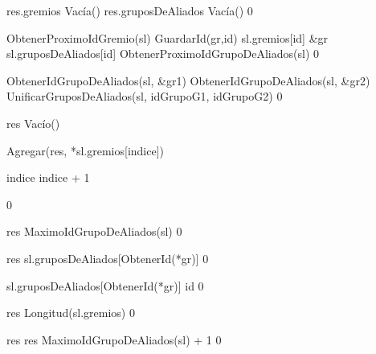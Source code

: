 {
	\state res.gremios \asig Vacía()					
	\state res.gruposDeAliados \asig Vacía()			
}
{0}

{
	\state {} \asig ObtenerProximoIdGremio(sl)			
	\state
	\state GuardarId(gr,id)												
	\state sl.gremios[id] \asig \&gr									
	\state sl.gruposDeAliados[id] \asig ObtenerProximoIdGrupoDeAliados(sl)			
}
{0}

{
	\state {} \asig ObtenerIdGrupoDeAliados(sl, \&gr1)			
	\state {} \asig ObtenerIdGrupoDeAliados(sl, \&gr2)			
	\state 
	\state UnificarGruposDeAliados(sl, idGrupoG1, idGrupoG2)							
}
{0}

{
	\state res \asig Vacío()								

	\state
	\state {} 						
					
		\state

		\state Agregar(res, *sl.gremios[indice])			

		\state
		\state indice \asig indice + 1						
	\endwhile
}
{0}

{
	\state res \asig MaximoIdGrupoDeAliados(sl)			
}
{0}

{
	\state res \asig sl.gruposDeAliados[ObtenerId(*gr)]			
}
{0}

{
	\state sl.gruposDeAliados[ObtenerId(*gr)] \asig id			
}
{0}

{
	\state res \asig Longitud(sl.gremios)			
}
{0}

{
						
		\state res 										
	\Else
		\state res \asig MaximoIdGrupoDeAliados(sl) + 1			
	\endif
}
{0}

